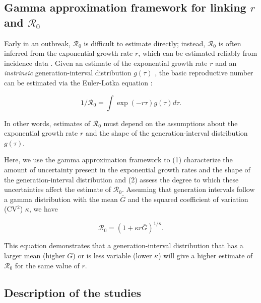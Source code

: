\documentclass[12pt]{article}
\newcommand{\Rx}[1]{\ensuremath{{\mathcal R}_{#1}}}
\newcommand{\Ro}{\Rx{0}\xspace}
\begin{document}
\subsection{Gamma approximation framework for linking $r$ and $\mathcal R_0$}

Early in an outbreak, \Ro is difficult to estimate directly;
instead, \Ro is often inferred from the exponential growth rate $r$, which can be estimated reliably from incidence data \citep{mills2004transmissibility, nishiura2009transmission, ma2014estimating}.
Given an estimate of the exponential growth rate $r$ and an \emph{instrinsic} generation-interval distribution $g(\tau)$ \citep{champredon2015intrinsic}, the basic reproductive
number can be estimated via the Euler-Lotka equation \citep{wallinga2007generation}:
\begin{linenomath*}
\begin{equation}
1/\mathcal R_0 = \int \exp(-r\tau) g(\tau) d\tau.
\label{eq:euler}
\end{equation}
\end{linenomath*}
In other words, estimates of \Ro must
depend on the assumptions about the
exponential growth rate $r$ and the shape of the generation-interval distribution $g(\tau)$.

Here, we use the gamma approximation framework \citep{mcbryde2009early, nishiura2009transmission, roberts2011early, park2019practical} to (1) characterize the amount of uncertainty present in the exponential growth rates and the shape of the generation-interval distribution and (2) assess the degree to which these uncertainties affect the estimate of \Ro.
Assuming that generation intervals follow a gamma distribution
with the mean $\bar G$ and the squared coefficient of variation (CV$^2$) $\kappa$, 
we have
\begin{linenomath*}
\begin{equation}
\mathcal R_0 = \left(1 + \kappa r \bar{G}\right)^{1/\kappa}.
\label{eq:gamma}
\end{equation}
\end{linenomath*}
This equation demonstrates that a generation-interval distribution
that has a larger mean (higher $\bar{G}$) or is less variable (lower $\kappa$)
will give a higher estimate of \Ro for the same value of $r$.

\subsection{Description of the studies}
\end{document}
